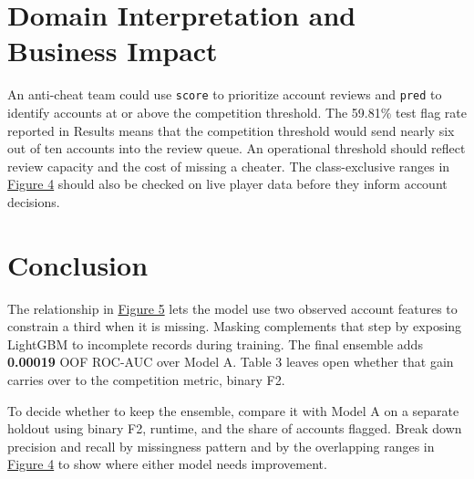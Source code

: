 \documentclass[11pt,a4paper]{article}
\begin{document}
\section{Domain Interpretation and Business Impact}

An anti-cheat team could use \texttt{score} to prioritize account reviews and \texttt{pred} to identify accounts at or above the competition threshold. The 59.81\% test flag rate reported in Results means that the competition threshold would send nearly six out of ten accounts into the review queue. An operational threshold should reflect review capacity and the cost of missing a cheater. The class-exclusive ranges in \hyperlink{task1-figure-4}{Figure 4} should also be checked on live player data before they inform account decisions.

\section{Conclusion}

The relationship in \hyperlink{task1-figure-5}{Figure 5} lets the model use two observed account features to constrain a third when it is missing. Masking complements that step by exposing LightGBM to incomplete records during training. The final ensemble adds \textbf{0.00019} OOF ROC-AUC over Model A. Table 3 leaves open whether that gain carries over to the competition metric, binary F2.

To decide whether to keep the ensemble, compare it with Model A on a separate holdout using binary F2, runtime, and the share of accounts flagged. Break down precision and recall by missingness pattern and by the overlapping ranges in \hyperlink{task1-figure-4}{Figure 4} to show where either model needs improvement.
\end{document}

